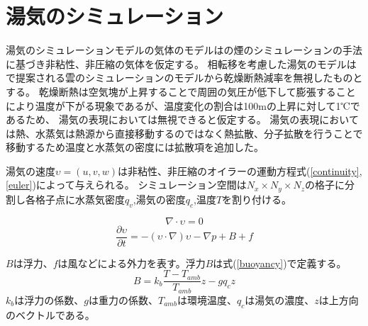 \section{湯気のシミュレーション}

湯気のシミュレーションモデルの気体のモデルは\cite{Fedkiw2001}の煙のシミュレーションの手法に基づき非粘性、非圧縮の気体を仮定する。
相転移を考慮した湯気のモデルは\cite{Miyazaki2002}\cite{Dobashi2008}で提案される雲のシミュレーションのモデルから乾燥断熱減率を無視したものとする。
乾燥断熱は空気塊が上昇することで周囲の気圧が低下して膨張することにより温度が下がる現象であるが、温度変化の割合は100mの上昇に対して1℃であるため、
湯気の表現においては無視できると仮定する。
湯気の表現においては熱、水蒸気は熱源から直接移動するのではなく熱拡散、分子拡散を行うことで移動するため温度と水蒸気の密度には拡散項を追加した。

湯気の速度$\upsilon=(u,v,w)$は非粘性、非圧縮のオイラーの運動方程式(\ref{continuity},\ref{euler})によって与えられる。
シミュレーション空間は$N_{x} \times N_{y} \times N_{z}$の格子に分割し各格子点に水蒸気密度$q_{v}$,湯気の密度$q_{c}$,温度$T$を割り付ける。

\begin{equation}
\label{continuity}
\nabla \cdot \upsilon = 0
\end{equation}
\begin{equation}
\label{euler}
\frac{\partial \upsilon}{\partial t} = -(\upsilon \cdot \nabla)\upsilon - \nabla p + B + f
\end{equation}

$B$は浮力、$f$は風などによる外力を表す。浮力$B$は式(\ref{buoyancy})で定義する。
\begin{equation}
\label{buoyancy}
B=k_{b}\frac{T-T_{amb}}{T_{amb}}z-gq_{c}z
\end{equation}
$k_{b}$は浮力の係数、$g$は重力の係数、$T_{amb}$は環境温度、$q_{c}$は湯気の濃度、$z$は上方向のベクトルである。

